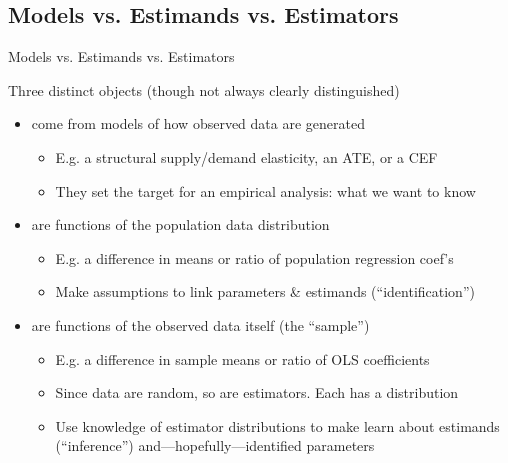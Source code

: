 \documentclass{beamer}
\begin{document}
\subsection{Models vs. Estimands vs. Estimators}
\begin{frame}{Models vs. Estimands vs. Estimators}

Three distinct objects (though not always clearly distinguished) \pause\medskip
{\small
\begin{itemize}
  \item {} come from models of how observed data are generated
  \begin{itemize}\itemsep0em
    \item E.g. a structural supply/demand elasticity, an ATE, or a CEF
    \item They set the target for an empirical analysis: what we want to know
  \end{itemize}\pause
  
  \item {} are functions of the population data distribution 
  \begin{itemize}\itemsep0em
    \item E.g. a difference in means or ratio of population regression coef's
    \item Make assumptions to link parameters \& estimands (``identification'')
  \end{itemize}\pause
  
  \item {} are functions of the observed data itself (the ``sample'')
  \begin{itemize}\itemsep0em
    \item E.g. a difference in sample means or ratio of OLS coefficients 
    \item Since data are random, so are estimators. Each has a distribution
    \item Use knowledge of estimator distributions to make learn about estimands (``inference'') and---hopefully---identified parameters
  \end{itemize}
\end{itemize}
}
\end{frame}
\end{document}
